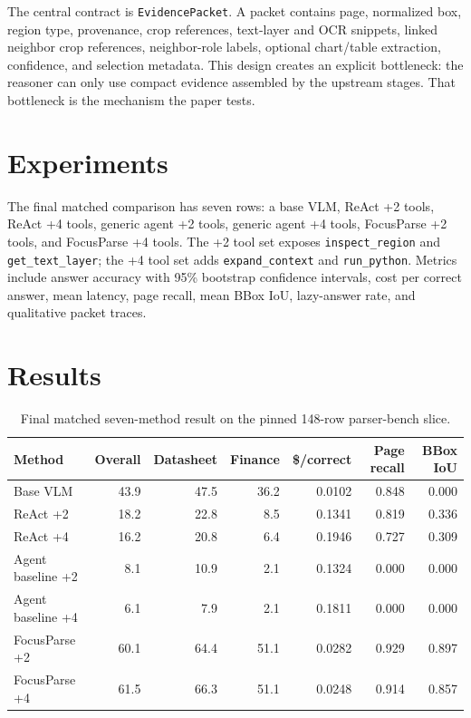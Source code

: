 \documentclass[10pt]{article}
\begin{document}
The central contract is \texttt{EvidencePacket}. A packet contains page,
normalized box, region type, provenance, crop references, text-layer and OCR
snippets, linked neighbor crop references, neighbor-role labels, optional
chart/table extraction, confidence, and selection metadata. This design creates
an explicit bottleneck: the reasoner can only use compact evidence assembled by
the upstream stages. That bottleneck is the mechanism the paper tests.

\section{Experiments}

The final matched comparison has seven rows: a base VLM, ReAct +2 tools, ReAct
+4 tools, generic agent +2 tools, generic agent +4 tools, FocusParse +2 tools,
and FocusParse +4 tools. The +2 tool set exposes \texttt{inspect\_region} and
\texttt{get\_text\_layer}; the +4 tool set adds \texttt{expand\_context} and
\texttt{run\_python}. Metrics include answer accuracy with 95\% bootstrap
confidence intervals, cost per correct answer, mean latency, page recall, mean
BBox IoU, lazy-answer rate, and qualitative packet traces.

\section{Results}

\begin{table}[t]
\centering
\caption{Final matched seven-method result on the pinned 148-row parser-bench slice.}
\label{tab:main-results}
\small
\begin{tabular}{lrrrrrr}
\toprule
Method & Overall & Datasheet & Finance & \$/correct & Page recall & BBox IoU \\
\midrule
Base VLM & 43.9 & 47.5 & 36.2 & 0.0102 & 0.848 & 0.000 \\
ReAct +2 & 18.2 & 22.8 & 8.5 & 0.1341 & 0.819 & 0.336 \\
ReAct +4 & 16.2 & 20.8 & 6.4 & 0.1946 & 0.727 & 0.309 \\
Agent baseline +2 & 8.1 & 10.9 & 2.1 & 0.1324 & 0.000 & 0.000 \\
Agent baseline +4 & 6.1 & 7.9 & 2.1 & 0.1811 & 0.000 & 0.000 \\
FocusParse +2 & 60.1 & 64.4 & 51.1 & 0.0282 & 0.929 & 0.897 \\
FocusParse +4 & 61.5 & 66.3 & 51.1 & 0.0248 & 0.914 & 0.857 \\
\bottomrule
\end{tabular}
\end{table}
\end{document}
